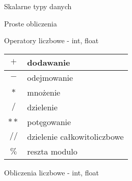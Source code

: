 \begin{frame}{Skalarne typy danych}
    
\end{frame}

\begin{frame}{Proste obliczenia}
    
\end{frame}

\begin{frame}{Operatory liczbowe - int, float}
    \begin{table}
        \centering
        \begin{tabular}{|c|l|}
            \hline
            $+$ & dodawanie \\
            \hline
            $-$ & odejmowanie \\
            \hline
            $*$ & mnożenie \\
            \hline
            $/$ & dzielenie \\
            \hline
            $**$ & potęgowanie \\
            \hline
            $//$ & dzielenie całkowitoliczbowe \\
            \hline
            $\%$ & reszta modulo \\
            \hline
        \end{tabular}
    \end{table}
\end{frame}

\begin{frame}{Obliczenia liczbowe - int, float}
    
\end{frame}

